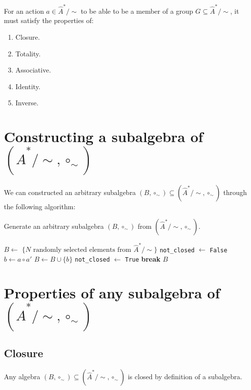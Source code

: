 For an action $a \in \hat{A}^{*}/\sim$ to be able to be a member of a group $G \subseteq \hat{A}^{*}/\sim$, it must satisfy the properties of:
\begin{enumerate}
    \item Closure.
    \item Totality.
    \item Associative.
    \item Identity.
    \item Inverse.
\end{enumerate}

\section{Constructing a subalgebra \texorpdfstring{of $(\hat{A}^{*}/\sim, \circ_{\sim})$}{}}

We can constructed an arbitrary subalgebra $(B, \circ_{\sim}) \subseteq (\hat{A}^{*}/\sim, \circ_{\sim})$ through the following algorithm:
\begin{algorithm}[H]
\caption{
Generate an arbitrary subalgebra $(B, \circ_{\sim})$ from $(\hat{A}^{*}/\sim, \circ_{\sim})$.
}
\hrulefill
\begin{algorithmic}[1]
\State $B \gets$ $\{ N \text{ randomly selected elements from } \hat{A}^{*}/\sim \}$
    \State \texttt{not\_closed} $\gets$ \texttt{False}
        \State $b \gets a \circ a'$
            \State $B \gets B \cup \{b\}$
            \State \texttt{not\_closed} $\gets$ \texttt{True}
        \EndIf
    \EndFor
        \State \textbf{break}
    \EndIf
\EndWhile
\State \Return $B$
\EndProcedure
\end{algorithmic}
\end{algorithm}

\section{
Properties of any subalgebra \texorpdfstring{of $(\hat{A}^{*}/\sim, \circ_{\sim})$}{}
}

\subsection{Closure}
Any algebra $(B, \circ_{\sim}) \subseteq (\hat{A}^{*}/\sim, \circ_{\sim})$ is closed by definition of a subalgebra.

